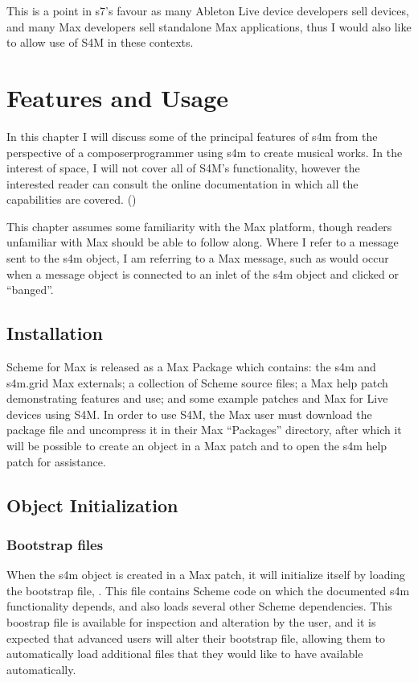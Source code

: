 \documentclass[letterpaper,10pt,english]{sphinxmanual}
\begin{document}
\sphinxAtStartPar
This is a point in s7’s favour as many Ableton Live device developers sell devices, and many Max developers sell standalone Max
applications, thus I would also like to allow use of S4M in these contexts.

\sphinxstepscope


\chapter{Features and Usage}
\label{\detokenize{features_usage:features-and-usage}}\label{\detokenize{features_usage::doc}}
\sphinxAtStartPar
In this chapter I will discuss some of the principal features of s4m from the perspective of a composer\sphinxhyphen{}programmer
using s4m to create musical works.
In the interest of space, I will not cover all of S4M’s functionality, however the interested
reader can consult the online documentation in which all the capabilities are covered.
()

\sphinxAtStartPar
This chapter assumes some familiarity with the Max platform, though readers unfamiliar with Max should be able to follow along.
Where I refer to a message sent to the s4m object, I am referring to a Max message, such as would occur
when a message object is connected to an inlet of the s4m object and clicked or “banged”.


\section{Installation}
\label{\detokenize{features_usage:installation}}
\sphinxAtStartPar
Scheme for Max is released as a Max Package which contains: the s4m and s4m.grid Max externals;
a collection of Scheme source files; a Max help patch demonstrating features and use;
and some example patches and Max for Live devices using S4M.
In order to use S4M, the Max user must download the package file and uncompress it in their Max
“Packages” directory, after which it will be possible to create an  object in a Max patch
and to open the s4m help patch for assistance.


\section{Object Initialization}
\label{\detokenize{features_usage:object-initialization}}

\subsection{Bootstrap files}
\label{\detokenize{features_usage:bootstrap-files}}
\sphinxAtStartPar
When the s4m object is created in a Max patch, it will initialize itself by loading the bootstrap file, .
This file contains Scheme code on which the documented s4m functionality depends, and also loads several other Scheme dependencies.
This boostrap file is available for inspection and alteration by the user, and it is expected that advanced users will
alter their bootstrap file, allowing them to automatically load additional files that they would like to have available automatically.
\end{document}
